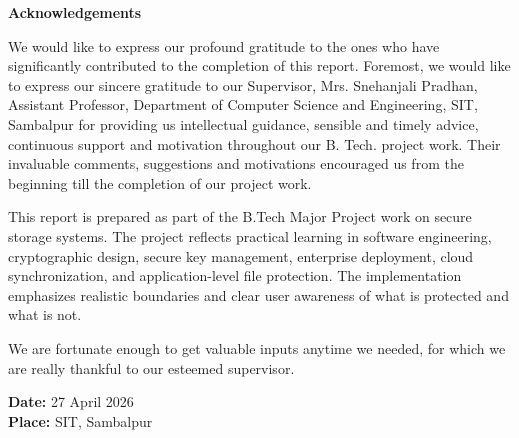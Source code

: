 \vspace*{0.5cm}
\begin{center}
	\textbf{\Large Acknowledgements}
\end{center}
\justify
{
We would like to express our profound gratitude to the ones who have significantly contributed to the completion of this report. Foremost, we would like to express our sincere gratitude to our Supervisor, Mrs. Snehanjali Pradhan, Assistant Professor, Department of Computer Science and Engineering, SIT, Sambalpur for providing us intellectual guidance, sensible and timely advice, continuous support and motivation throughout our B. Tech. project work. Their invaluable comments, suggestions and motivations encouraged us from the beginning till the completion of our project work.

This report is prepared as part of the B.Tech Major Project work on secure storage systems. The project reflects practical learning in software engineering, cryptographic design, secure key management, enterprise deployment, cloud synchronization, and application-level file protection. The implementation emphasizes realistic boundaries and clear user awareness of what is protected and what is not.

We are fortunate enough to get valuable inputs anytime we needed, for which we are really thankful to our esteemed supervisor.
}
\flushleft
\textbf{Date:} 27 April 2026 \\
\textbf{Place:} SIT, Sambalpur \\

